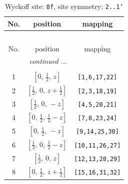 \documentclass[fleqn,8pt]{jsarticle}
\begin{document}
\begin{longtable}{ccc}
\caption{Wyckoff site: {\tt 8f}, site symmetry: {\tt 2..1'}}
 \\
 \hline \hline
No. & position & mapping \\ \hline \endfirsthead

\multicolumn{2}{l}{\tablename\ \thetable{}} \\
 \hline \hline
No. & position & mapping \\ \hline \endhead

 \hline \hline
\multicolumn{2}{r}{\footnotesize\it continued ...} \\ \endfoot

 \hline \hline
\multicolumn{2}{r}{} \\ \endlastfoot

1 & $\left[ 0,\, \frac{1}{2},\, z \right]$ & {\tt [1,6,17,22]} \\ \hline
2 & $\left[ \frac{1}{2},\, 0,\, z + \frac{1}{2} \right]$ & {\tt [2,3,18,19]} \\ \hline
3 & $\left[ \frac{1}{2},\, 0,\, - z \right]$ & {\tt [4,5,20,21]} \\ \hline
4 & $\left[ 0,\, \frac{1}{2},\, \frac{1}{2} - z \right]$ & {\tt [7,8,23,24]} \\ \hline
5 & $\left[ 0,\, \frac{1}{2},\, - z \right]$ & {\tt [9,14,25,30]} \\ \hline
6 & $\left[ \frac{1}{2},\, 0,\, \frac{1}{2} - z \right]$ & {\tt [10,11,26,27]} \\ \hline
7 & $\left[ \frac{1}{2},\, 0,\, z \right]$ & {\tt [12,13,28,29]} \\ \hline
8 & $\left[ 0,\, \frac{1}{2},\, z + \frac{1}{2} \right]$ & {\tt [15,16,31,32]} \\
\end{longtable}
\renewcommand{\arraystretch}{1.2}
\end{document}
